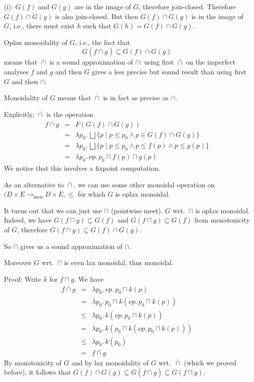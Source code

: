 \documentclass[9pt]{article}
\newcommand{\tomon}{\to_{\mathrm{mon}}}
\newcommand{\bigjoin}{\bigsqcup}
\newcommand{\meet}{\sqcap}
\newcommand{\con}{\wedge}
\newcommand{\caplift}{\mathbin{\overline{\cap}}}
\begin{document}
(i): $G (f)$ and $G (g)$ are in the image of $G$, therefore
join-closed.  Therefore $G(f) \cap G(g)$ is also join-closed.  But
then $G(f) \cap G(g)$ is in the image of $G$, i.e., there must exist
$h$ such that $G(h) = G(f) \cap G(g)$.

Oplax monoidality of $G$, i.e., the fact that 
\[
G (f \caplift g) \subseteq G (f) \cap G (g)  
\]
means that $\caplift$ is a sound approximation of $\cap$: using first
$\caplift$ on the imperfect analyses $f$ and $g$ and then $G$ gives a
less precise but sound result than using first $G$ and then $\cap$.

Monoidality of $G$ means that $\caplift$ is in fact as precise as
$\cap$.

Explicitly, $\caplift$ is the operation
\begin{eqnarray*}
f \caplift g & = & F (G (f) \cap G(g)) \\
& = & \lambda p_0.\, \bigjoin \{ p \mid p \leq p_0 \con p \in G (f) \cap G (g) \} \\
& = & \lambda p_0.\, \bigjoin \{ p \mid p \leq p_0 \con p \leq f (p) \con p \leq g (p) \} \\
& = & \lambda p_0.\, \nu p.\, p_0 \meet f(p) \meet g(p)
\end{eqnarray*}
We notice that this involves a fixpoint computation. 

As an alternative to $\caplift$, we can use some other monoidal
operation on $(D \times E \tomon D \times E, \leq$ for which $G$ is
oplax monoidal.

It turns out that we can just use $\meet$ (pointwise meet). $G$ wrt.\
$\meet$ is oplax monoidal.  Indeed, we have
$G (f \meet g) \subseteq G (f)$ and $G (f \meet g) \subseteq G (f)$
from monotonicity of $G$, therefore
$G (f \meet g) \subseteq G (f) \cap G (g)$.

So $\meet$ gives us a sound approximation of $\cap$.

Moreover $G$ wrt.\ $\meet$ is even lax monoidal, thus monoidal.

Proof: Write $k$ for $f \meet g$. We have
\begin{eqnarray*}
  f \caplift g
& = & \lambda p_0.\, \nu p.\, p_0 \meet k (p) \\
& = & \lambda p_0.\, p_0 \meet k (\nu p.\, p_0 \meet k (p)) \\
& \leq & \lambda p_0.\, k (\nu p.\, p_0 \meet k (p)) \\
& = & \lambda p_0.\, k (p_0 \meet k (\nu p.\, p_0 \meet k (p))) \\
& \leq & \lambda p_0.\, k (p_0) \\
& = & f \meet g
\end{eqnarray*}
By monotonicity of $G$ and by lax monoidality of $G$ wrt.\ $\caplift$
(which we proved before), it follows that
$G (f) \cap G (g) \subseteq G (f \caplift g) \subseteq G (f \meet g)$.
\end{document}
